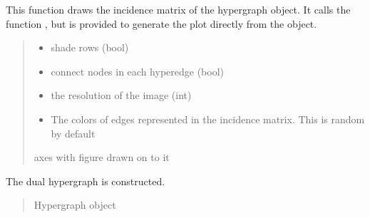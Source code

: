 \documentclass[letterpaper,10pt,english]{sphinxmanual}
\begin{document}
\begin{fulllineitems}
\begin{fulllineitems}
\label{\detokenize{HAT:HAT.Hypergraph.Hypergraph.draw}}
\pysigstartsignatures
{}
\pysigstopsignatures
\sphinxAtStartPar
This function draws the incidence matrix of the hypergraph object. It calls the function
, but is provided to generate the plot directly from the object.
\begin{quote}\begin{description}
\begin{itemize}
\item {} 
\sphinxAtStartPar
{} \textendash{} shade rows (bool)

\item {} 
\sphinxAtStartPar
{} \textendash{} connect nodes in each hyperedge (bool)

\item {} 
\sphinxAtStartPar
{} \textendash{} the resolution of the image (int)

\item {} 
\sphinxAtStartPar
{} \textendash{} The colors of edges represented in the incidence matrix. This is random by default

\end{itemize}

\sphinxAtStartPar
{} axes with figure drawn on to it

\end{description}\end{quote}

\end{fulllineitems}


\begin{fulllineitems}
\label{\detokenize{HAT:HAT.Hypergraph.Hypergraph.dual}}
\pysigstartsignatures
{}
\pysigstopsignatures
\sphinxAtStartPar
The dual hypergraph is constructed.
\begin{quote}\begin{description}
\sphinxAtStartPar
Hypergraph object


\end{description}
\end{quote}
\end{fulllineitems}
\end{fulllineitems}
\end{document}
